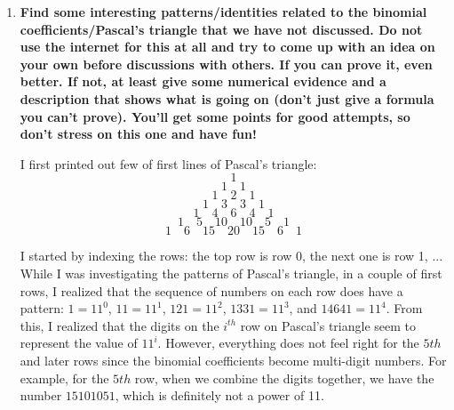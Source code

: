 \documentclass[10pt]{article}
\begin{document}
\begin{enumerate}
\begin{enumerate}
We need to find the constant $C$. Let $x = 0$, then we have:

\begin{align*}
    \frac{(0+1)^{n+1}}{n+1} &= \sum\limits_{k=0}^n\binom{n}{k}\frac{0^{k+1}}{k+1} + C\\
    \frac{1}{n+1} &= C \text{ (since $\sum\limits_{k=0}^n\binom{n}{k}\frac{0^{k+1}}{k+1} = \sum\limits_{k=0}^n\binom{n}{k}\frac{0}{k+1} = 0$)}\\
    \text{Therefore, we have: } \frac{(x+1)^{n+1}}{n+1} &= \sum\limits_{k=0}^n\binom{n}{k}\frac{x^{k+1}}{k+1} + \frac{1}{n+1}
\end{align*}

Let $x=1$, then we have:

\begin{align*}
    \frac{(1+1)^{n+1}}{n+1} &= \sum\limits_{k=0}^n\binom{n}{k}\frac{1^{k+1}}{k+1} + \frac{1}{n+1}\\
    \frac{2^{n+1}}{n+1} &= \sum\limits_{k=0}^n\binom{n}{k}\frac{1}{k+1} + \frac{1}{n+1}\\
    \frac{2^{n+1}-1}{n+1}&= \sum\limits_{k=0}^n\binom{n}{k}\frac{1}{k+1}\\
\end{align*}

Therefore, the conjecture is proven.

\end{enumerate}
 pt

\item 
\textbf{Find some interesting patterns/identities related to the binomial coefficients/Pascal's triangle that we have not discussed.  {\bf Do not use the internet for this at all and try to come up with an idea on your own before discussions with others}. If you can prove it, even better. If not, at least give some numerical evidence and a description that shows what is going on (don't just give a formula you can't prove).  You'll get some points for good attempts, so don't stress on this one and have fun!}

I first printed out few of first lines of Pascal's triangle:
\newpage
$$1$$
$$1 \quad 1$$
$$1\quad 2\quad 1$$
$$1\quad 3\quad 3\quad 1$$
$$1\quad 4\quad 6\quad 4\quad 1$$
$$1\quad 5 \quad 10\quad 10 \quad 5\quad 1$$
$$1\quad 6 \quad 15\quad 20 \quad 15\quad 6 \quad 1$$

I started by indexing the rows: the top row is row 0, the next one is row 1, ... While I was investigating the patterns of Pascal's triangle, in a couple of first rows, I realized that the sequence of numbers on each row does have a pattern: $1 = 11^0$, $11 = 11^1$, $121 = 11^2$, $1331 = 11^3$, and $14641 =  11^4$. From this, I realized that the digits on the $i^{th}$ row on Pascal's triangle seem to represent the value of $11^i$. However, everything does not feel right for the $5{th}$ and later rows since the binomial coefficients become multi-digit numbers. For example, for the $5{th}$ row, when we combine the digits together, we have the number $15101051$, which is definitely not a power of 11.


\end{enumerate}
\end{document}
